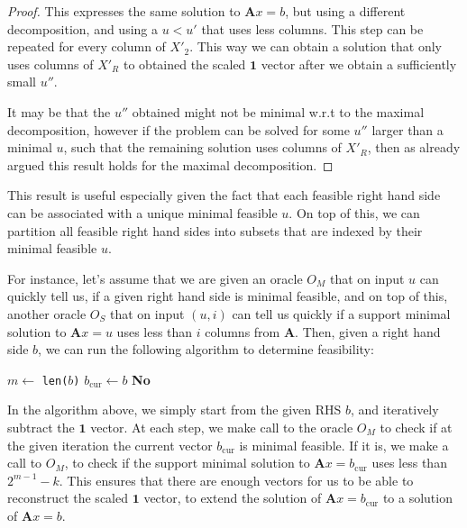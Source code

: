 \documentclass{article}
\begin{document}
\begin{adjustwidth}{10pt}{10pt}
\begin{proof}
This expresses the same solution to $\mathbf{A}x = b$, but using a different decomposition, and using a $u<u'$ that uses less columns. This step can be repeated for every column of $X'_2$. This way we can obtain a solution that only uses columns of $X'_R$ to obtained the scaled $\mathbf{1}$ vector after we obtain a sufficiently small $u''$. 

It may be that the $u''$ obtained might not be minimal w.r.t to the maximal decomposition, however if the problem can be solved for some $u''$ larger than a minimal $u$, such that the remaining solution uses columns of $X'_R$, then as already argued this result holds for the maximal decomposition. 
\end{proof}
\end{adjustwidth}
This result is useful especially given the fact that each feasible right hand side can be associated with a unique minimal feasible $u$. On top of this, we can partition all feasible right hand sides into subsets that are indexed by their minimal feasible $u$.

For instance, let's assume that we are given an oracle $O_M$ that on input $ u $ can quickly tell us, if a given right hand side is minimal feasible, and on top of this, another oracle $O_S$ that on input $(u, i)$ can tell us quickly if a support minimal solution to $ \mathbf{A}x = u $ uses less than $ i $ columns from $ \mathbf{A} $.  Then, given a right hand side $b$, we can run the following algorithm to determine feasibility:

\IncMargin{2em}
\begin{algorithm}
	\BlankLine
	$ m \gets  $ \texttt{len($ b $)}\;
	$b_\text{cur}\gets b$\;
\Return \textbf{No}
\end{algorithm}\DecMargin{2em}
In the algorithm above, we simply start from the given RHS $ b $, and iteratively subtract the $\mathbf{1}$ vector. At each step, we make call to the oracle $ O_M $ to check if at the given iteration the current vector $ b_\text{cur} $ is minimal feasible. If it is, we make a call to $ O_M $, to check if the support minimal solution to $ \mathbf{A}x = b_\text{cur} $ uses less than  $ 2^{m-1}-k $. This ensures that there are enough vectors for us to be able to reconstruct the scaled $ \mathbf{1} $ vector, to extend the solution of $ \mathbf{A}x = b_\text{cur} $ to a solution of $ \mathbf{A}x = b $.
\end{document}
